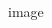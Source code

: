 \documentclass{beamer}
\begin{document}
\begin{frame}
\begin{columns}[t]
\begin{column}{0.5\textwidth}
\begin{figure}
        \caption{image}
      \end{figure}			
		\end{column}
	\end{columns}
\end{frame}






\end{document}
